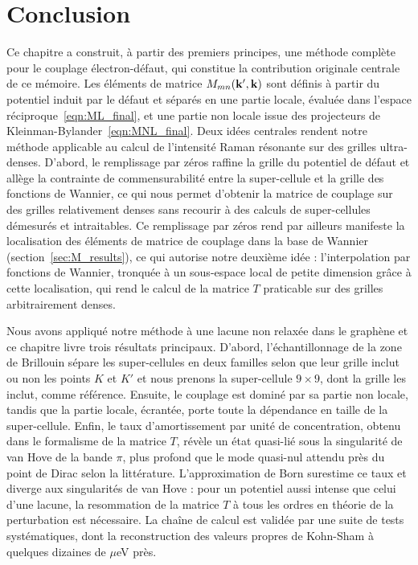 \section{Conclusion}
Ce chapitre a construit, à partir des premiers principes, une méthode complète pour le couplage électron-défaut, qui constitue la contribution originale centrale de ce mémoire. Les éléments de matrice $M_{mn}(\mathbf{k}',\mathbf{k})$ sont définis à partir du potentiel induit par le défaut et séparés en une partie locale, évaluée dans l'espace réciproque~\eqref{eqn:ML_final}, et une partie non locale issue des projecteurs de Kleinman-Bylander~\eqref{eqn:MNL_final}. Deux idées centrales rendent notre méthode applicable au calcul de l'intensité Raman résonante sur des grilles ultra-denses. D'abord, le remplissage par zéros raffine la grille du potentiel de défaut et allège la contrainte de commensurabilité entre la super-cellule et la grille des fonctions de Wannier, ce qui nous permet d'obtenir la matrice de couplage sur des grilles relativement denses sans recourir à des calculs de super-cellules démesurés et intraitables. Ce remplissage par zéros rend par ailleurs manifeste la localisation des éléments de matrice de couplage dans la base de Wannier (section~\ref{sec:M_results}), ce qui autorise notre deuxième idée : l'interpolation par fonctions de Wannier, tronquée à un sous-espace local de petite dimension grâce à cette localisation, qui rend le calcul de la matrice $T$ praticable sur des grilles arbitrairement denses.

Nous avons appliqué notre méthode à une lacune non relaxée dans le graphène et ce chapitre livre trois résultats principaux. D'abord, l'échantillonnage de la zone de Brillouin sépare les super-cellules en deux familles selon que leur grille inclut ou non les points $K$ et $K'$ et nous prenons la super-cellule $9\times 9$, dont la grille les inclut, comme référence. Ensuite, le couplage est dominé par sa partie non locale, tandis que la partie locale, écrantée, porte toute la dépendance en taille de la super-cellule. Enfin, le taux d'amortissement par unité de concentration, obtenu dans le formalisme de la matrice $T$, révèle un état quasi-lié sous la singularité de van Hove de la bande $\pi$, plus profond que le mode quasi-nul attendu près du point de Dirac selon la littérature. L'approximation de Born surestime ce taux et diverge aux singularités de van Hove : pour un potentiel aussi intense que celui d'une lacune, la resommation de la matrice $T$ à tous les ordres en théorie de la perturbation est nécessaire. La chaîne de calcul est validée par une suite de tests systématiques, dont la reconstruction des valeurs propres de Kohn-Sham à quelques dizaines de $\mu$eV près.


